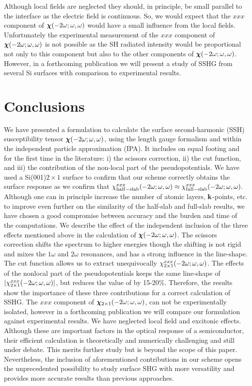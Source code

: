 \documentclass[floatfix,prb,aps,superscriptaddress,showpacs,11pt,preprint,letterpaper]{revtex4}
\begin{document}
Although local fields are neglected they should, in principle, 
be small parallel to the interface as the electric field is continuous.
So, we would expect that the $xxx$ component of 
$\boldsymbol{\chi}(-2\omega;\omega,\omega)$ would have a small influence from the local fields.
Unfortunately the experimental measurement of the $xxx$
component of $\boldsymbol{\chi}(-2\omega;\omega,\omega)$ is not possible as the SH 
radiated intensity would be proportional not only to this component 
but also to the other components of $\boldsymbol{\chi}(-2\omega;\omega,\omega)$.  
However,
in a forthcoming publication 
we will present a study of SSHG from several 
Si surfaces 
with comparison to experimental 
results. 

\section{Conclusions}\label{conc}

We have presented a formulation to calculate the surface second-harmonic
(SSH) susceptibility tensor $\boldsymbol{\chi}(-2\omega;\omega,\omega)$, using the length gauge
formalism and within the independent particle approximation (IPA).
It includes on equal footing and for the first time in the literature: 
i) the scissors correction, ii) the cut function, and iii) the
contribution of the non-local part of the pseudopotentials.
We have used a Si(001)$2\times 1$ surface to confirm that our scheme
correctly obtains the surface response as we confirm
that 
$\chi_{\mathrm{half-slab}}^{xxx}(-2\omega;\omega,\omega) 
\approx
\chi_{\mathrm{full-slab}}^{xxx}(-2\omega;\omega,\omega) 
. 
$
Although one can in principle increase the number of atomic layers,
$\mathbf{k}$-points, etc. to
improve even further on the similarity of the half-slab and full-slab results, we
have chosen a good compromise between accuracy and the burden and time
of the computations. 
We describe the effect of the independent inclusion of the three
effects mentioned above in the calculation of  
$\boldsymbol{\chi}(-2\omega;\omega,\omega)$. 
The scissors correction shifts the spectrum to  
higher energies though the shifting is not rigid and mixes the 
$1\omega$ and $2\omega$ resonances,  
and has a strong influence in the line-shape.
 The cut function allows us  
to extract unequivocally $\chi^{xxx}_{2\times 1}(-2\omega;\omega,\omega)$.
 The effects of the nonlocal part of the pseudopotentials  
keeps the same line-shape of $|\chi^{xxx}_{2\times
  1}(-2\omega;\omega,\omega)|$,
but  
reduces the value of   
by 15-20\%. 
Therefore,  
the results show the importance of these three contributions for a correct calculation 
of SSHG.
The $xxx$ component of  
$\boldsymbol{\chi}_{2\times 1}(-2\omega;\omega,\omega)$, 
can not be
experimentally isolated,
however in a forthcoming publication 
we will compare our formulation 
against
experimental 
results. 
We have neglected
local field 
and excitonic effects.
Although these are important factors in the optical response of a semiconductor,
their efficient calculation is theoretically and 
numerically challenging and still 
under debate.\cite{beyond}  
This merits further study but is beyond the scope of this paper. 
Nevertheless, the inclusion of aforementioned contributions 
in
our scheme opens the unprecedented possibility to study 
surface SHG with more versatility and provides 
more accurate results than previous approaches. 
\end{document}
